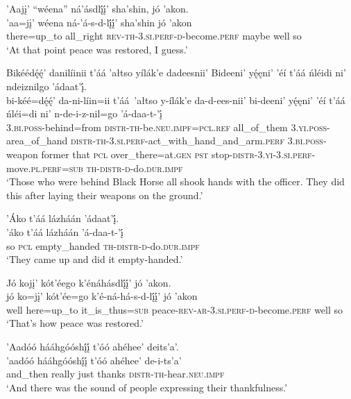 \ea\label{ex:text1-69-2}
’Aajį’ ``wéena'' ná’ásdlį́į́’ sha’shin, jó ’akon.\\
\gll ’aa=jį’	wéena	ná-’á-s-d-lį́į́’	sha’shin	jó	’akon\\
     there=up\_to	all\_right	\textsc{rev}-\textsc{th}-3.\textsc{si}.\textsc{perf}-\textsc{d}-become.\textsc{perf}	maybe	well	so\\
\glt `At that point peace was restored, I guess.'
\z

\ea\label{ex:text1-69-3}
Bikéédę́ę́’ danilíinii t’áá ’ałtso yílák’e dadeesnii’ Bideeni’ yę́ęni’ ’éí t’áá ńléidi ni’ ndeiznilgo ’ádaat’į́.\\
\gll bi-kéé=dę́ę́’	da-ni-líin=ii	t’áá~{’ałtso}	y-ílák’e	da-d-ees-nii’	bi-deeni’	yę́ęni’	’éí	t’áá	ńléi=di	ni’	n-de-i-z-nil=go	’á-daa-t-’į́\\
     3.\textsc{bi}.\textsc{poss}-behind=from	\textsc{distr}-\textsc{th}-be.\textsc{neu}.\textsc{impf}=\textsc{pcl}.\textsc{ref}	all\_of\_them	3.\textsc{yi}.\textsc{poss}-area\_of\_hand	\textsc{distr}-\textsc{th}-3.\textsc{si}.\textsc{perf}-act\_with\_hand\_and\_arm.\textsc{perf}	3.\textsc{bi}.\textsc{poss}-weapon	former	that	\textsc{pcl}	over\_there=at.\textsc{gen}	\textsc{pst}	stop-\textsc{distr}-3.\textsc{yi}-3.\textsc{si}.\textsc{perf}-move.\textsc{pl}.\textsc{perf}=\textsc{sub}	\textsc{th}-\textsc{distr}-\textsc{d}-do.\textsc{dur}.\textsc{impf}\\
\glt `Those who were behind Black Horse all shook hands with the officer. They did this after laying their weapons on the ground.'
\z

\ea\label{ex:text1-69-4}
’Áko t’áá lázháán ’ádaat’į́.\\
\gll ’áko	t’áá	lázháán	’á-daa-t-’į́\\
     so	\textsc{pcl}	empty\_handed	\textsc{th}-\textsc{distr}-\textsc{d}-do.\textsc{dur}.\textsc{impf}\\
\glt `They came up and did it empty-handed.'
\z

\ea\label{ex:text1-69-5}
Jó kojį’ kót’éego k’énáhásdlį́į́’ jó ’akon.\\
\gll jó	ko=jį’	kót’ée=go	k’é-ná-há-s-d-lį́į́’	jó	’akon\\
     well	here=up\_to	it\_is\_thus=\textsc{sub}	peace-\textsc{rev}-\textsc{ar}-3.\textsc{si}.\textsc{perf}-\textsc{d}-become.\textsc{perf}	well	so\\
\glt `That's how peace was restored.'
\z

\ea\label{ex:text1-69-6}
’Aadóó hááhgóóshį́į́ t’óó ahéhee’ deits’a’.\\
\gll ’aadóó	hááhgóóshį́į́	t’óó	ahéhee’	de-i-ts’a’\\
     and\_then	really	just	thanks	\textsc{distr}-\textsc{th}-hear.\textsc{neu}.\textsc{impf}\\
\glt `And there was the sound of people expressing their thankfulness.'
\z

